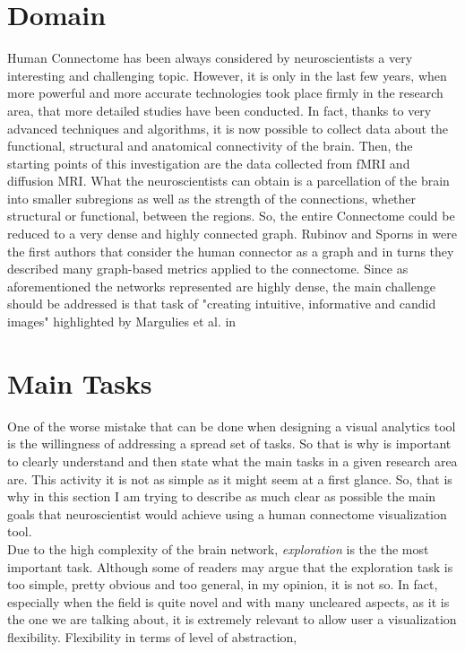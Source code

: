 \documentclass{article}
\begin{document}
\begin{multicols}{2}
\section{Domain}
Human Connectome has been always considered by neuroscientists a very interesting and challenging topic. However, it is only in the last few years, when more powerful and more accurate technologies took place firmly in the research area, that more detailed studies have been conducted. In fact, thanks to very advanced techniques and algorithms, it is now possible to collect data about the functional, structural and anatomical connectivity of the brain. Then, the starting points of this investigation are the data collected from fMRI and diffusion MRI. What the neuroscientists can obtain is a parcellation of the brain into smaller subregions as well as the strength of the connections, whether structural or functional, between the regions. So, the entire Connectome could be reduced to a very dense and highly connected graph. Rubinov and Sporns in \cite{complexNetworkMeasures} were the first authors that consider the human connector as a graph and in turns they described many graph-based metrics applied to the connectome.  Since as aforementioned the networks represented are highly dense, the main challenge should be addressed is that task of "creating intuitive, informative and candid images" highlighted by Margulies et al. in \cite{visualizingHumanConnectome}

\section{Main Tasks}
One of the worse mistake that can be done when designing a visual analytics tool is the willingness of addressing a spread set of tasks. So that is why is important to clearly understand and then state what the main tasks in a given research area are. This activity it is not as simple as it might seem at a first glance. So, that is why in this section I am trying to describe as much clear as possible the main goals that neuroscientist would achieve using a human connectome visualization tool.\\
Due to the high complexity of the brain network, \textit{exploration} is the the most important task. Although some of readers may argue that the exploration task is too simple, pretty obvious and too general, in my opinion, it is not so. In fact, especially when the field is quite novel and with many uncleared aspects, as it is the one we are talking about, it is extremely relevant to allow user a visualization flexibility. Flexibility in terms of level of abstraction, 



\end{multicols}
\end{document}
